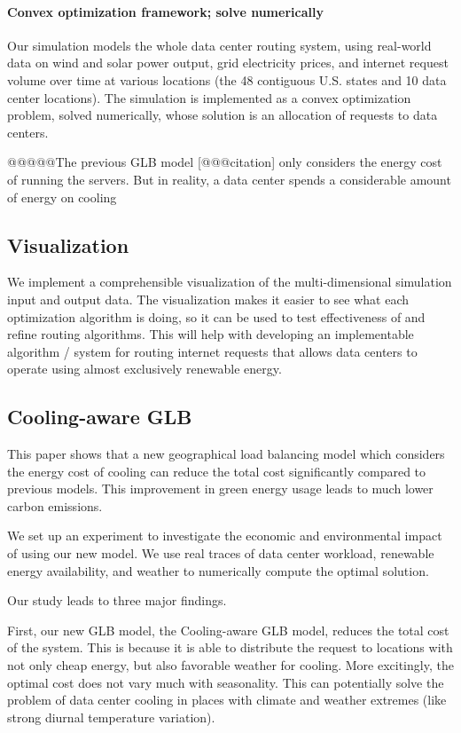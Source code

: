 \documentclass{acm_proc_article-sp}
\begin{document}
		\paragraph{Convex optimization framework; solve numerically}
			Our simulation models the whole data center routing system, using real-world data on wind and solar power output, grid electricity prices, and internet request volume over time at various locations (the 48 contiguous U.S. states and 10 data center locations). The simulation is implemented as a convex optimization problem, solved numerically, whose solution is an allocation of requests to data centers.
		
		@@@@@The previous GLB model [@@@citation] only considers the energy cost of running the servers. But in reality, a data center spends a considerable amount of energy on cooling


\subsection{Visualization}
We implement a comprehensible visualization of the multi-dimensional simulation input and output data. The visualization makes it easier to see what each optimization algorithm is doing, so it can be used to test effectiveness of and refine routing algorithms. This will help with developing an implementable algorithm / system for routing internet requests that allows data centers to operate using almost exclusively renewable energy.

\subsection{Cooling-aware GLB}

This paper shows that a new geographical load balancing model which considers the energy cost of cooling can reduce the total cost significantly compared to previous models. This improvement in green energy usage leads to much lower carbon emissions.

We set up an experiment to investigate the economic and environmental impact of using our new model. We use real traces of data center workload, renewable energy availability, and weather to numerically compute the optimal solution.%

Our study leads to three major findings.

First, our new GLB model, the Cooling-aware GLB model, reduces the total cost of the system. This is because it is able to distribute the request to locations with not only cheap energy, but also favorable weather for cooling. More excitingly, the optimal cost does not vary much with seasonality. This can potentially solve the problem of data center cooling in places with climate and weather extremes (like strong diurnal temperature variation).
\end{document}
